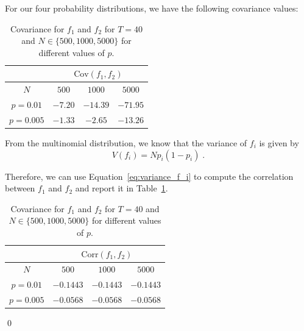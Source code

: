 \documentclass{article}
\begin{document}
For our four probability distributions, we have the following covariance values:
\begin{table}[h]
    \centering
    \begin{tabular}{c|c c c}
        \toprule
         & \multicolumn{3}{c}{$\mathrm{Cov}(f_1, f_2)$} \\
        \midrule
        $N$ & $500$ & $1000$ & $5000$ \\
        \midrule
        $p=0.01$  & $-7.20$   & $-14.39$  & $-71.95$ \\
        $p=0.005$ & $-1.33$   & $-2.65$   & $-13.26$ \\
    \end{tabular}
    \caption{Covariance for $f_1$ and $f_2$ for $T=40$ and $N \in \{500, 1000, 5000\}$ for different values of $p$.}
\end{table}

From the multinomial distribution, we know that the variance of $f_i$ is given by
\begin{equation}
    V(f_i) = N p_i (1-p_i)\;. \label{eq:variance_f_i}
\end{equation}

Therefore, we can use Equation~\ref{eq:variance_f_i} to compute the correlation between $f_1$ and $f_2$ and report it in Table~\ref{tab:correlation_f1_f2}.
\begin{table}[h]
    \centering
    \begin{tabular}{c|c c c}
        \toprule
         & \multicolumn{3}{c}{$\mathrm{Corr}(f_1, f_2)$} \\
        \midrule
        $N$ & $500$ & $1000$ & $5000$ \\
        \midrule
        $p=0.01$  & $-0.1443$   & $-0.1443$  & $-0.1443$ \\
        $p=0.005$ & $-0.0568$   & $-0.0568$  & $-0.0568$ \\
    \end{tabular}
    \caption{Covariance for $f_1$ and $f_2$ for $T=40$ and $N \in \{500, 1000, 5000\}$ for different values of $p$.}
    \label{tab:correlation_f1_f2}
\end{table}

\qed
\end{document}
